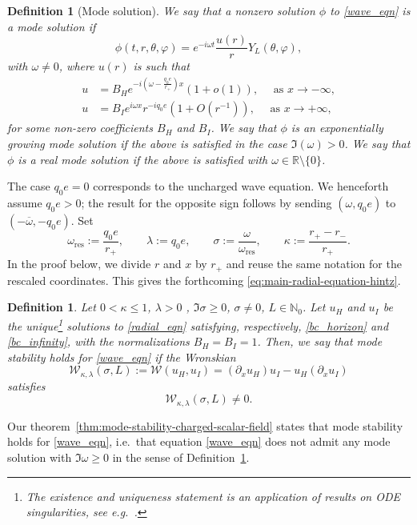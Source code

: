 \documentclass[11pt]{article}
\numberwithin{equation}{section}
\newtheorem{definition}[theorem]{Definition}
\newcommand{\br}[1]{\left( #1 \right)}
\begin{document}
	\begin{definition}[Mode solution] \label{def:mode_solution}
		We say that a {nonzero solution $\phi$ to \eqref{wave_eqn}} is a mode solution if 
		\[
		\phi(t, r, \theta, {\varphi}) = e^{-i\omega t} \frac{u(r)}{r}Y_L(\theta, {\varphi}),
		\]
		with $\omega \ne 0$,  where  $u(r)$ is such that
		\begin{align}
			u &= B_H e^{-i \br{\omega - \frac{q_0 e}{r_+}} x} \br{1 + o(1)}, \quad \text{ as } x \to -\infty, \label{bc_horizon} \\
			u &= B_I e^{i \omega x}r^{-i q_0 e}\br{1 + O( r^{-1})}, \quad \text{ as } x \to +\infty, \label{bc_infinity}
		\end{align}
		for some non-zero coefficients $B_H$ and $B_I$.
		We say that $\phi$ is an exponentially growing mode solution if the above is satisfied in the case $\Im(\omega) > 0$. We say that $\phi$ is a real mode solution if the above is satisfied with $\omega \in \mathbb{R} \setminus \{ 0\}$.
	\end{definition}
	
	
	The case $q_0e=0$ corresponds to the uncharged wave equation. We henceforth assume
	$q_0e>0$; the result for the opposite sign follows by sending
	$(\omega,q_0e)$ to $(-\overline\omega,-q_0e)$. Set
	\[
	\omega_{\mathrm{res}}:=\frac{q_0e}{r_+},
	\qquad \lambda:=q_0e,
	\qquad \sigma:=\frac{\omega}{\omega_{\mathrm{res}}},
	\qquad \kappa:=\frac{r_+-r_-}{r_+}.
	\]
	In the proof below, we divide $r$ and $x$ by $r_+$ and reuse the same
	notation for the rescaled coordinates. This gives the forthcoming 
	\eqref{eq:main-radial-equation-hintz}. 
	
	\begin{definition} Let  $0< \kappa \le 1$, $\lambda >0$ , $\Im \sigma \ge 0$, {$\sigma\ne0$}, $L \in \mathbb{N}_0$.	Let $u_H$ and $u_I$ be the unique\footnote{The existence and uniqueness statement is an application of results on ODE singularities, see e.g.\ \cite{PSRVdM_asymptotics, RVdM}.} solutions to \eqref{radial_eqn} satisfying, respectively, \eqref{bc_horizon} and \eqref{bc_infinity}{, with the normalizations $B_H=B_I=1$}. Then, we say that \emph{mode stability} holds for \eqref{wave_eqn} if the Wronskian 
		\[
		\mathcal W_{\kappa,\lambda}(\sigma,L) := \mathcal W(u_H, u_I) = \br{\partial_x u_H } u_I - u_H \br{ \partial_x u_I}
		\]
		satisfies
		\[
		\mathcal W_{\kappa,\lambda}(\sigma,L) \ne 0.
		\]
	\end{definition}
	Our theorem~\ref{thm:mode-stability-charged-scalar-field} states that mode stability holds for \eqref{wave_eqn}, i.e.\ that equation \eqref{wave_eqn}  does not admit any mode solution {with $\Im\omega\ge0$} in the sense of {Definition~\ref{def:mode_solution}}.
	
\end{document}
